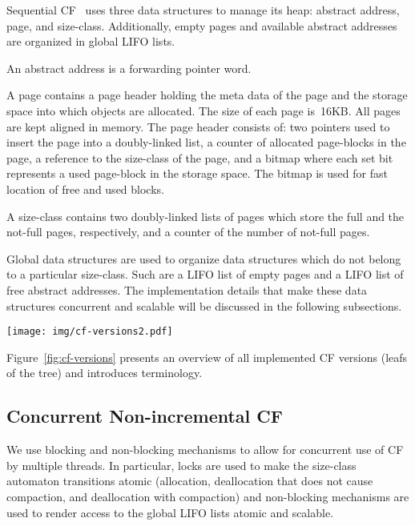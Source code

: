 \documentclass{amsart}
\begin{document}
Sequential CF~\cite{USENIX08} uses three data structures to manage its
heap: {abstract address}, {page}, and {size-class}.  Additionally,
empty pages and available abstract addresses are organized in global
LIFO lists.

An abstract address is a forwarding pointer word.

A {page} contains a page header holding the meta data of the page and
the storage space into which objects are allocated.  The size of each
{page} is~16KB.  All pages are kept aligned in memory.  The page
header consists of: two pointers used to insert the page into a
doubly-linked list, a counter of allocated page-blocks in the page, a
reference to the size-class of the page, and a bitmap where each set
bit represents a used page-block in the storage space.  The bitmap is
used for fast location of free and used blocks.

A size-class contains two doubly-linked lists of pages which store the
full and the not-full pages, respectively, and a counter of the number
of not-full pages.

Global data structures are used to organize data structures which do
not belong to a particular size-class.  Such are a LIFO list of empty
pages and a LIFO list of free abstract addresses.  The implementation
details that make these data structures concurrent and scalable will
be discussed in the following subsections.

\begin{figure*}
    \begin{center}
        \texttt{[image: img/cf-versions2.pdf]}
        \caption{Concurrent CF versions}
        \label{fig:cf-versions}
    \end{center}
\end{figure*}

Figure~\ref{fig:cf-versions} presents an overview of all implemented
CF versions (leafs of the tree) and introduces terminology.

\subsection{Concurrent Non-incremental CF}\label{subsec:conc-ninc-cf}

We use blocking and non-blocking mechanisms to allow for concurrent
use of CF by multiple threads.  In particular, locks are used to make
the size-class automaton transitions atomic (allocation, deallocation
that does not cause compaction, and deallocation with compaction) and
non-blocking mechanisms are used to render access to the global LIFO
lists atomic and scalable.
\end{document}
